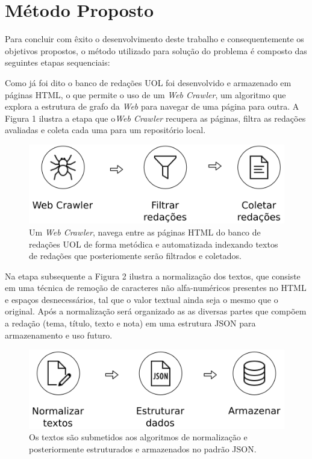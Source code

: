 \chapter{Método Proposto}\label{meto}

Para concluir com êxito o desenvolvimento deste trabalho e consequentemente os objetivos propostos, o método utilizado para solução do problema é composto das seguintes etapas sequenciais:

Como já foi dito o banco de redações UOL foi desenvolvido e armazenado em páginas HTML, o que permite o uso de um \textit{Web Crawler}, um algoritmo que explora a estrutura de grafo da \textit{Web} para navegar de uma página para outra. A Figura 1 ilustra a etapa que o\textit{Web Crawler} recupera as páginas, filtra as redações avaliadas e coleta cada uma para um repositório local.

\begin{figure}[H]
\begin{center}
    \includegraphics[scale=0.75]{figuras/metodologia_1.png}
\end{center}
\caption{Um \textit{Web Crawler}, navega entre as páginas HTML do banco de redações UOL de forma metódica e automatizada indexando textos de redações que posteriomente serão filtrados e coletados.}
\label{Img:WebCrawler}
\end{figure}

Na etapa subsequente a Figura 2 ilustra a normalização dos textos, que consiste em uma técnica de remoção de caracteres não alfa-numéricos presentes no HTML e espaços desnecessários, tal que o valor textual ainda seja o mesmo que o original. Após a normalização será organizado as as diversas partes que compõem a redação (tema, título, texto e nota) em uma estrutura JSON para armazenamento e uso futuro. 

\begin{figure}[H]
\begin{center}
    \includegraphics[scale=0.75]{figuras/metodologia_2.png}
\end{center}
\caption{Os textos são submetidos aos algoritmos de normalização e posteriormente estruturados e armazenados no padrão JSON.}
\label{Img:NormalizeOrganize}
\end{figure}

